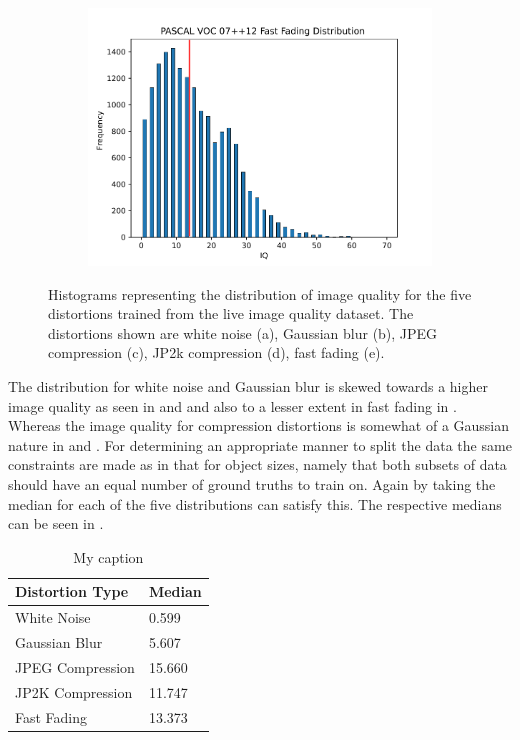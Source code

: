 \begin{figure}[H]
\begin{subfigure}[b]{0.4\textwidth}
        \includegraphics[width=\textwidth]{Figs/Implementation/FastFadingdistred.pdf}
        \caption{}\label{fig:dist_ff}
    \end{subfigure}
    \caption{Histograms representing the distribution of image quality for the five distortions trained from the \gls{live} image quality dataset. The distortions shown are white noise (a), Gaussian blur (b), JPEG compression (c), JP2k compression (d), fast fading (e).}
    \label{fig:iqdist}
\end{figure} 

The distribution for white noise and Gaussian blur is skewed towards a higher image quality as seen in  and  and also to a lesser extent in fast fading in . Whereas the image quality for compression distortions is somewhat of a Gaussian nature in  and . For determining an appropriate manner to split the data the same constraints are made as in that for object sizes, namely that both subsets of data should have an equal number of ground truths to train on. Again by taking the median for each of the five distributions can satisfy this. The respective medians can be seen in .

\begin{table}[h]
\centering
\caption{My caption}
\label{tab:iq_splits}
\begin{tabular}{|l|l|}
\hline
\textbf{Distortion Type}   & \textbf{Median} \\ \hline
White Noise       & 0.599  \\ \hline
Gaussian Blur     & 5.607  \\ \hline
JPEG Compression  & 15.660 \\ \hline
JP2K Compression & 11.747 \\ \hline
Fast Fading       & 13.373 \\ \hline
\end{tabular}
\end{table}

